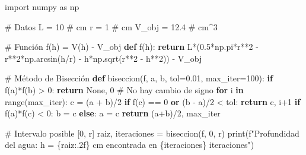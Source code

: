 \documentclass[
  english,
  letterpaper,
  DIV=11,
  numbers=noendperiod]{scrartcl}
\newenvironment{Shaded}{\begin{snugshade}}{\end{snugshade}}
\newcommand{\BuiltInTok}[1]{\textcolor[rgb]{0.00,0.23,0.31}{#1}}
\newcommand{\CommentTok}[1]{\textcolor[rgb]{0.37,0.37,0.37}{#1}}
\newcommand{\ControlFlowTok}[1]{\textcolor[rgb]{0.00,0.23,0.31}{\textbf{#1}}}
\newcommand{\DecValTok}[1]{\textcolor[rgb]{0.68,0.00,0.00}{#1}}
\newcommand{\FloatTok}[1]{\textcolor[rgb]{0.68,0.00,0.00}{#1}}
\newcommand{\ImportTok}[1]{\textcolor[rgb]{0.00,0.46,0.62}{#1}}
\newcommand{\KeywordTok}[1]{\textcolor[rgb]{0.00,0.23,0.31}{\textbf{#1}}}
\newcommand{\NormalTok}[1]{\textcolor[rgb]{0.00,0.23,0.31}{#1}}
\newcommand{\OperatorTok}[1]{\textcolor[rgb]{0.37,0.37,0.37}{#1}}
\newcommand{\SpecialCharTok}[1]{\textcolor[rgb]{0.37,0.37,0.37}{#1}}
\newcommand{\SpecialStringTok}[1]{\textcolor[rgb]{0.13,0.47,0.30}{#1}}
\newcommand{\VariableTok}[1]{\textcolor[rgb]{0.07,0.07,0.07}{#1}}
\begin{document}
\begin{Shaded}
\begin{Highlighting}[]
\ImportTok{import}\NormalTok{ numpy }\ImportTok{as}\NormalTok{ np}

\CommentTok{\# Datos}
\NormalTok{L }\OperatorTok{=} \DecValTok{10}  \CommentTok{\# cm}
\NormalTok{r }\OperatorTok{=} \DecValTok{1}   \CommentTok{\# cm}
\NormalTok{V\_obj }\OperatorTok{=} \FloatTok{12.4}  \CommentTok{\# cm\^{}3}

\CommentTok{\# Función f(h) = V(h) {-} V\_obj}
\KeywordTok{def}\NormalTok{ f(h):}
    \ControlFlowTok{return}\NormalTok{ L}\OperatorTok{*}\NormalTok{(}\FloatTok{0.5}\OperatorTok{*}\NormalTok{np.pi}\OperatorTok{*}\NormalTok{r}\OperatorTok{**}\DecValTok{2} \OperatorTok{{-}}\NormalTok{ r}\OperatorTok{**}\DecValTok{2}\OperatorTok{*}\NormalTok{np.arcsin(h}\OperatorTok{/}\NormalTok{r) }\OperatorTok{{-}}\NormalTok{ h}\OperatorTok{*}\NormalTok{np.sqrt(r}\OperatorTok{**}\DecValTok{2} \OperatorTok{{-}}\NormalTok{ h}\OperatorTok{**}\DecValTok{2}\NormalTok{)) }\OperatorTok{{-}}\NormalTok{ V\_obj}

\CommentTok{\# Método de Bisección}
\KeywordTok{def}\NormalTok{ biseccion(f, a, b, tol}\OperatorTok{=}\FloatTok{0.01}\NormalTok{, max\_iter}\OperatorTok{=}\DecValTok{100}\NormalTok{):}
    \ControlFlowTok{if}\NormalTok{ f(a)}\OperatorTok{*}\NormalTok{f(b) }\OperatorTok{\textgreater{}} \DecValTok{0}\NormalTok{:}
        \ControlFlowTok{return} \VariableTok{None}\NormalTok{, }\DecValTok{0}  \CommentTok{\# No hay cambio de signo}
    \ControlFlowTok{for}\NormalTok{ i }\KeywordTok{in} \BuiltInTok{range}\NormalTok{(max\_iter):}
\NormalTok{        c }\OperatorTok{=}\NormalTok{ (a }\OperatorTok{+}\NormalTok{ b)}\OperatorTok{/}\DecValTok{2}
        \ControlFlowTok{if}\NormalTok{ f(c) }\OperatorTok{==} \DecValTok{0} \KeywordTok{or}\NormalTok{ (b }\OperatorTok{{-}}\NormalTok{ a)}\OperatorTok{/}\DecValTok{2} \OperatorTok{\textless{}}\NormalTok{ tol:}
            \ControlFlowTok{return}\NormalTok{ c, i}\OperatorTok{+}\DecValTok{1}
        \ControlFlowTok{if}\NormalTok{ f(a)}\OperatorTok{*}\NormalTok{f(c) }\OperatorTok{\textless{}} \DecValTok{0}\NormalTok{:}
\NormalTok{            b }\OperatorTok{=}\NormalTok{ c}
        \ControlFlowTok{else}\NormalTok{:}
\NormalTok{            a }\OperatorTok{=}\NormalTok{ c}
    \ControlFlowTok{return}\NormalTok{ (a}\OperatorTok{+}\NormalTok{b)}\OperatorTok{/}\DecValTok{2}\NormalTok{, max\_iter}

\CommentTok{\# Intervalo posible [0, r]}
\NormalTok{raiz, iteraciones }\OperatorTok{=}\NormalTok{ biseccion(f, }\DecValTok{0}\NormalTok{, r)}
\BuiltInTok{print}\NormalTok{(}\SpecialStringTok{f"Profundidad del agua: h = }\SpecialCharTok{\{}\NormalTok{raiz}\SpecialCharTok{:.2f\}}\SpecialStringTok{ cm encontrada en }\SpecialCharTok{\{}\NormalTok{iteraciones}\SpecialCharTok{\}}\SpecialStringTok{ iteraciones"}\NormalTok{)}
\end{Highlighting}
\end{Shaded}
\end{document}
